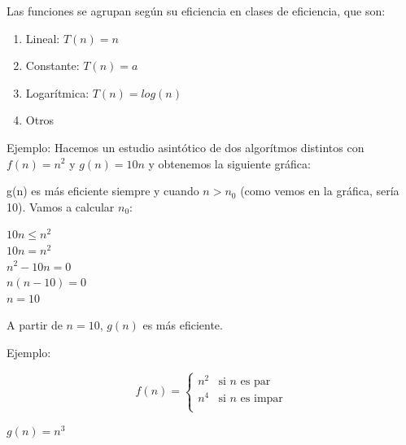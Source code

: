 \documentclass[10pt,a4paper,spanish]{report}
\begin{document}
\noindent
Las funciones se agrupan según su eficiencia en clases de eficiencia, que son:

\begin{enumerate}[$\bullet$]
\item Lineal: $T(n) = n$
\item Constante: $T(n) = a$
\item Logarítmica: $T(n) = log(n)$
\item Otros
\end{enumerate}

\noindent
Ejemplo: Hacemos un estudio asintótico de dos algorítmos distintos con $f(n) = n^{2}$ y $g(n)=10n$ y obtenemos la siguiente gráfica:


\noindent
g(n) es más eficiente siempre y cuando $n>n_{0}$ (como vemos en la gráfica, sería 10). Vamos a calcular $n_{0}$:

\begin{center}
$10n \leq n^{2}$ \\
$10n = n^{2}$ \\
$n^{2} - 10n = 0$ \\
$n(n - 10) = 0$ \\
$n = 10$
\end{center}

\noindent
A partir de $n = 10$, $g(n)$ es más eficiente.

\noindent
Ejemplo:

\begin{displaymath}
f(n) = \left\{ \begin{array}{ll}
n^{2} & \textrm{si $n$ es par}\\
n^{4} & \textrm{si $n$ es impar} \\
\end{array} \right.
\end{displaymath}
\begin{center}
$g(n)=n^{3}$
\end{center}
\end{document}
